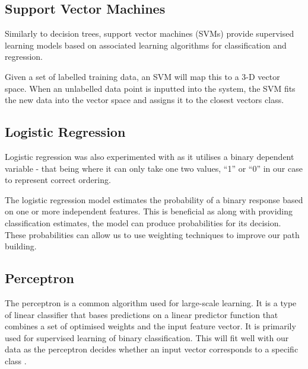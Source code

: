 \documentclass[bsc,frontabs,twoside,singlespacing,parskip,deptreport]{infthesis}     %
\begin{document}

\subsection{Support Vector Machines}
Similarly to decision trees, support vector machines (SVMs) provide supervised learning models based on
associated learning algorithms for classification and regression.

Given a set of labelled training data, an SVM will map this to a 3-D vector space.
When an unlabelled data point is inputted into the system, the SVM fits the new data into the vector space and
assigns  it to the closest vectors class.

\subsection{Logistic Regression}
Logistic regression was also experimented with as it utilises a binary dependent variable - that being where it
can only take one two values, ``1'' or ``0'' in our case to represent correct ordering.


The logistic regression model estimates the probability of a binary response based on one or more independent features.
This is beneficial as along with providing classification estimates, the model can produce probabilities for its
decision. These probabilities can allow us to use weighting techniques to improve our path building.

\subsection{Perceptron}
The perceptron is a common algorithm used for large-scale learning.
It is a type of linear classifier that bases predictions on a linear predictor function that combines a set of optimised weights
and the input feature vector.
It is primarily used for supervised learning of binary classification.
This will fit well with our data as the perceptron decides whether an input vector
corresponds to a specific class \cite{freund1999large}.
\end{document}
